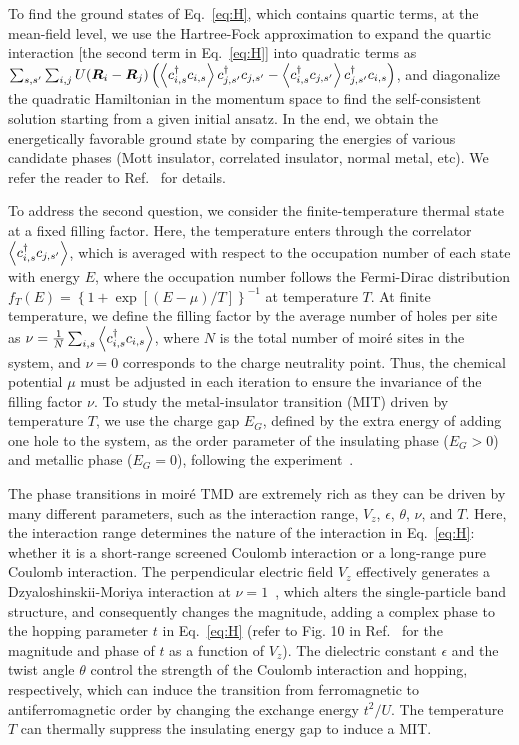 \documentclass[aps,prb,twocolumn,superscriptaddress,longbibliography]{revtex4-2}
\begin{document}
To find the ground states of Eq.~\eqref{eq:H}, which contains quartic terms, at the mean-field level, we use the Hartree-Fock approximation to expand the quartic interaction [the second term in Eq.~\eqref{eq:H}] into quadratic terms as $\sum_{s,s'}\sum_{i,j} U(\bm{R}_i-\bm{R}_j)\left( \expval{c_{i,s}^\dagger c_{i,s}} c_{j,s'}^\dagger c_{j,s'}-\expval{c_{i,s}^\dagger c_{j,s'}} c_{j,s'}^\dagger c_{i,s} \right)$, and diagonalize the quadratic Hamiltonian in the momentum space to find the self-consistent solution starting from a given initial ansatz. In the end, we obtain the energetically favorable ground state by comparing the energies of various candidate phases (Mott insulator, correlated insulator, normal metal, etc). We refer the reader to Ref.~ for details.

To address the second question, we consider the finite-temperature thermal state at a fixed filling factor.  Here, the temperature enters through the correlator $\expval{c_{i,s}^\dagger c_{j,s'}}$, which is averaged with respect to the occupation number of each state with energy $E$, where the occupation number follows the Fermi-Dirac distribution $f_T(E)=\left\{ 1+\exp[(E-\mu)/T] \right\}^{-1}$ at temperature $T$. At finite temperature, we define the filling factor by the average number of holes per site as $\nu=\frac{1}{N}\sum_{i,s} \expval{c_{i,s}^\dagger c_{i,s}}$, where $N$ is the total number of moir\'e sites in the system, and $\nu=0$ corresponds to the charge neutrality point.
Thus, the chemical potential $\mu$ must be adjusted in each iteration to ensure the invariance of the filling factor $\nu$. 
To study the metal-insulator transition (MIT) driven by temperature $T$, we use the charge gap $E_G$, defined by the extra energy of adding one hole to the system, as the order parameter of the insulating phase ($E_G>0$) and metallic phase ($E_G=0$), following the experiment~\cite{ghiotto2021quantum}. 

The phase transitions in moir\'e TMD are extremely rich as they can be driven by many different parameters, such as the interaction range, $V_z$, $ \epsilon$, $\theta$, $ \nu$, and $T$. Here, the interaction range determines the nature of the interaction in Eq.~\eqref{eq:H}: whether it is a short-range screened Coulomb interaction or a long-range pure Coulomb interaction. The perpendicular electric field $V_z$ effectively generates a Dzyaloshinskii-Moriya interaction at $\nu=1$~\cite{pan2020band}, which alters the single-particle band structure, and consequently changes the magnitude, adding a complex phase to the hopping parameter $t$ in Eq.~\eqref{eq:H} (refer to Fig. 10 in Ref.~ for the magnitude and phase of $t$ as a function of $V_z$). The dielectric constant $\epsilon$ and the twist angle $\theta$ control the strength of the Coulomb interaction and hopping, respectively, which can induce the transition from ferromagnetic to antiferromagnetic order by changing the exchange energy $t^2/U$.  The temperature $T$ can thermally suppress the insulating energy gap to induce a MIT. 
\end{document}
